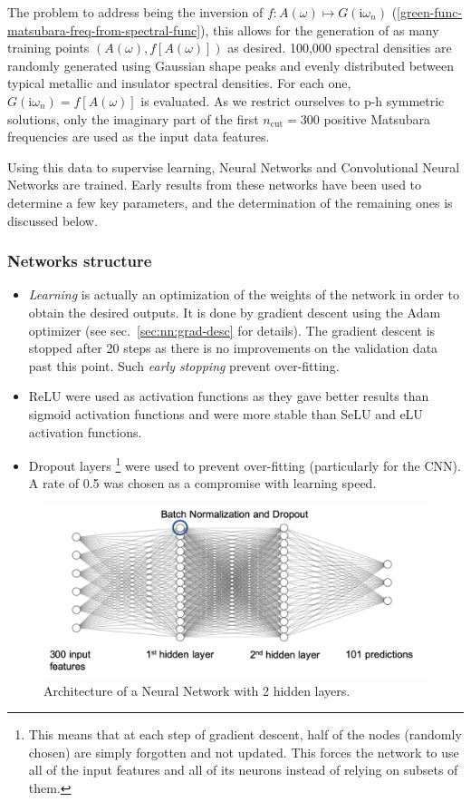 \documentclass[reprint,amsmath,amssymb,aps,pra]{revtex4-2}
\newcommand{\iwn}{\mathrm{i}\omega_n}
\begin{document}
The problem to address being the inversion of $f : A(\omega) \mapsto G(\iwn)$ (\ref{green-func-matsubara-freq-from-spectral-func}), this allows for the generation of as many training points $(A(\omega),f[A(\omega)])$ as desired. 100,000 spectral densities are randomly generated using Gaussian shape peaks and evenly distributed between typical metallic and insulator spectral densities. For each one, $G(\iwn)=f[A(\omega)]$ is evaluated. As we restrict ourselves to p-h symmetric solutions, only the imaginary part of the first $n_\text{cut}=300$ positive Matsubara frequencies are used as the input data features.

Using this data to supervise learning, Neural Networks and Convolutional Neural Networks are trained. Early results from these networks have been used to determine a few key parameters, and the determination of the remaining ones is discussed below.

\subsubsection{Networks structure}

\begin{itemize}
    \item \emph{Learning} is actually an optimization of the weights of the network in order to obtain the desired outputs. It is done by gradient descent using the Adam optimizer (see sec.~\ref{sec:nn:grad-desc} for details). The gradient descent is stopped after 20 steps as there is no improvements on the validation data past this point. Such \emph{early stopping} prevent over-fitting.
    \item ReLU were used as activation functions as they gave better results than sigmoid activation functions and were more stable than SeLU and eLU activation functions.
    \item Dropout layers \footnote{This means that at each step of gradient descent, half of the nodes (randomly chosen) are simply forgotten and not updated. This forces the network to use all of the input features and all of its neurons instead of relying on subsets of them.} were used to prevent over-fitting (particularly for the CNN). A rate of 0.5 was chosen as a compromise with learning speed.
\end{itemize}

\begin{figure}[H]
\includegraphics[width=\columnwidth]{analytical_continuation/NN_architecture.png}
\caption{\label{fig:NN_archi}Architecture of a Neural Network with 2 hidden layers.}
\end{figure}
\end{document}
